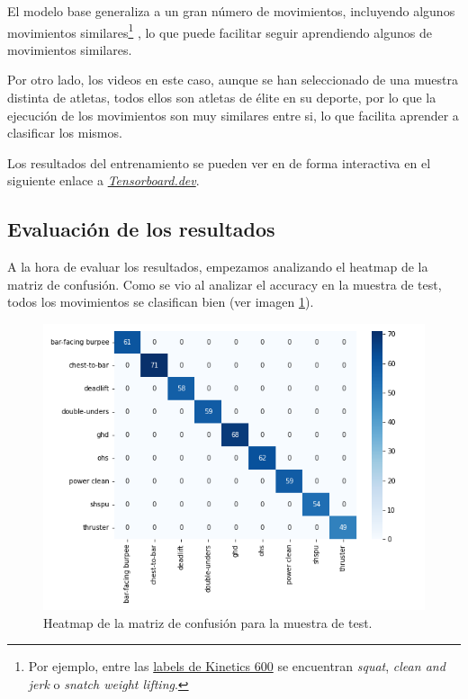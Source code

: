 El modelo base generaliza a un gran número de movimientos, incluyendo algunos movimientos similares\footnote{Por ejemplo, entre las  \href{https://raw.githubusercontent.com/tensorflow/models/f8af2291cced43fc9f1d9b41ddbf772ae7b0d7d2/official/projects/movinet/files/kinetics_600_labels.txt}{labels de Kinetics 600} se encuentran \textit{squat}, \textit{clean and jerk} o \textit{snatch weight lifting}.} , lo que puede facilitar seguir aprendiendo algunos de movimientos similares.

Por otro lado, los videos en este caso, aunque se han seleccionado de una muestra distinta de atletas, todos ellos son atletas de élite en su deporte, por lo que la ejecución de los movimientos son muy similares entre si, lo que facilita aprender a clasificar los mismos.

Los resultados del entrenamiento se pueden ver en de forma interactiva en el siguiente enlace a \href{https://tensorboard.dev/experiment/UXyupsnMQ2S74vdul3vdbw/#scalars}{\textit{Tensorboard.dev}}.


\subsection{Evaluación de los resultados}

A la hora de evaluar los resultados, empezamos analizando el heatmap de la matriz de confusión. Como se vio al analizar el accuracy en la muestra de test, todos los movimientos se clasifican bien (ver imagen \ref{app_3}).

\begin{figure}[H]
    \centering
		\includegraphics[width=\textwidth]{figs/heatmap_confusion.png}
\caption{Heatmap de la matriz de confusión para la muestra de test.}\label{app_3}
\end{figure}

